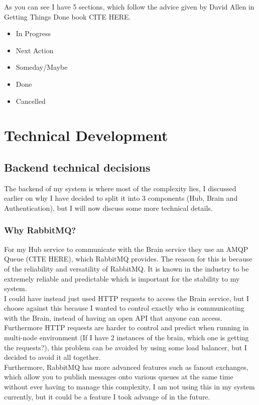 \documentclass[titlepage]{article}
\begin{document}
As you can see I have 5 sections, which follow the advice given by David Allen in Getting Things Done book CITE HERE.

\begin{itemize}
  \item In Progress
  \item Next Action
  \item Someday/Maybe
  \item Done
  \item Cancelled
\end{itemize}

\pagebreak
\section{Technical Development}
\subsection{Backend technical decisions}
The backend of my system is where most of the complexity lies, I discussed earlier on why I have decided to split it into 3 components (Hub, Brain and Authentication), but I will now discuss some more technical details.

\subsubsection{Why RabbitMQ?}
For my Hub service to communicate with the Brain service they use an AMQP Queue (CITE HERE), which RabbitMQ provides. The reason for this is because of the reliability and versatility of RabbitMQ. It is known in the industry to be extremely reliable and predictable which is important for the stability to my system. \\

I could have instead just used HTTP requests to access the Brain service, but I choose against this because I wanted to control exactly who is communicating with the Brain, instead of having an open API that anyone can access. Furthermore HTTP requests are harder to control and predict when running in multi-node environment (If I have 2 instances of the brain, which one is getting the requests?), this problem can be avoided by using some load balancer, but I decided to avoid it all together. \\

Furthermore, RabbitMQ has more advanced features such as fanout exchanges, which allow you to publish messages onto various queues at the same time without ever having to manage this complexity, I am not using this in my system currently, but it could be a feature I took advange of in the future.
\end{document}
